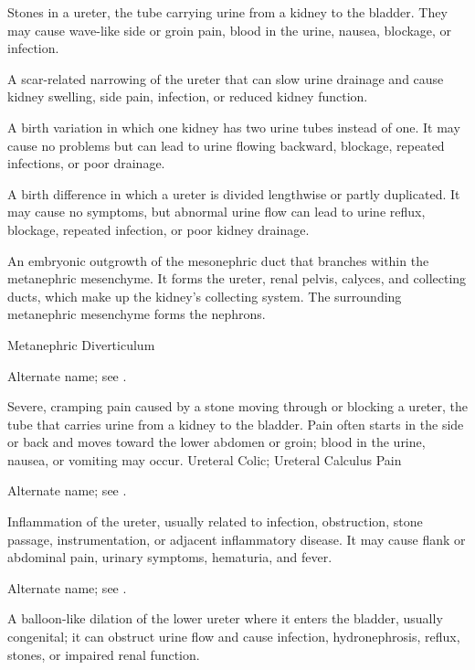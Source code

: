  Stones in a ureter, the tube carrying urine from a kidney to the bladder. They may cause wave-like side or groin pain, blood in the urine, nausea, blockage, or infection.

 A scar-related narrowing of the ureter that can slow urine drainage and cause kidney swelling, side pain, infection, or reduced kidney function.

 A birth variation in which one kidney has two urine tubes instead of one. It may cause no problems but can lead to urine flowing backward, blockage, repeated infections, or poor drainage.

 A birth difference in which a ureter is divided lengthwise or partly duplicated. It may cause no symptoms, but abnormal urine flow can lead to urine reflux, blockage, repeated infection, or poor kidney drainage.

 An embryonic outgrowth of the mesonephric duct that branches within the metanephric mesenchyme. It forms the ureter, renal pelvis, calyces, and collecting ducts, which make up the kidney’s collecting system. The surrounding metanephric mesenchyme forms the nephrons.

\synonyms
Metanephric Diverticulum

 Alternate name; see .

 Severe, cramping pain caused by a stone moving through or blocking a ureter, the tube that carries urine from a kidney to the bladder. Pain often starts in the side or back and moves toward the lower abdomen or groin; blood in the urine, nausea, or vomiting may occur.
\synonyms
Ureteral Colic; Ureteral Calculus Pain

 Alternate name; see .

 Inflammation of the ureter, usually related to infection, obstruction, stone passage,
instrumentation, or adjacent inflammatory disease. It may cause flank or abdominal pain,
urinary symptoms, hematuria, and fever.

 Alternate name; see .

 A balloon-like dilation of the lower ureter where it enters the bladder, usually congenital; it can obstruct urine flow and cause infection, hydronephrosis, reflux, stones, or impaired renal function.

